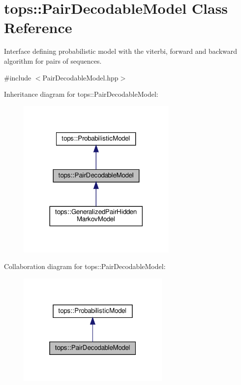 \hypertarget{classtops_1_1PairDecodableModel}{}\section{tops\+:\+:Pair\+Decodable\+Model Class Reference}
\label{classtops_1_1PairDecodableModel}


Interface defining probabilistic model with the viterbi, forward and backward algorithm for pairs of sequences.  




{\ttfamily \#include $<$Pair\+Decodable\+Model.\+hpp$>$}



Inheritance diagram for tops\+:\+:Pair\+Decodable\+Model\+:
\nopagebreak
\begin{figure}[H]
\begin{center}
\leavevmode
\includegraphics[width=221pt]{classtops_1_1PairDecodableModel__inherit__graph}
\end{center}
\end{figure}


Collaboration diagram for tops\+:\+:Pair\+Decodable\+Model\+:
\nopagebreak
\begin{figure}[H]
\begin{center}
\leavevmode
\includegraphics[width=211pt]{classtops_1_1PairDecodableModel__coll__graph}
\end{center}
\end{figure}
